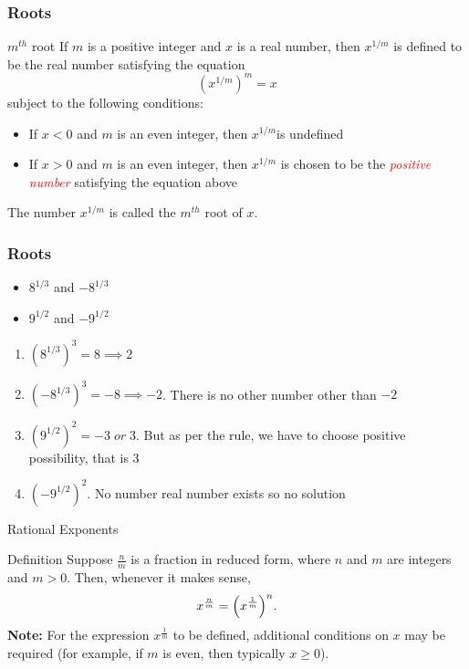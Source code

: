   \begin{frame}
    \frametitle{Roots}
    \begin{block}{\(m^{th}\) root}
   If \(m\) is a positive integer and \(x\) is a real number, then \(x^{1/m}\) is defined to be the real number satisfying the equation
   \[\left(x^{1/m}\right)^{m} = x \]
  subject to the following conditions:
  \begin{itemize}
    \item  If \(x < 0\) and \(m\) is an even integer, then \(x^{1/m} \)is undefined 
    \item If \(x > 0\) and \(m\) is an even integer, then \(x^{1/m} \) is chosen to be the \textit{\textcolor{red}{positive number}} satisfying the equation above
  \end{itemize}
The number \(x^{1/m}\) is called the \textbf{\(m^{th}\)} root of \(x\).
\end{block}
  
\end{frame}
\begin{frame}
  \frametitle{Roots}
  \begin{example}
    \begin{itemize}
      \item \(8^{1/3}\) and \(-8^{1/3}\)
      \item \(9^{1/2}\) and \(-9^{1/2}\)
    \end{itemize}
  \end{example}
  \begin{solution}
    \begin{enumerate}
      \item \( \left(8^{1/3}\right)^{3} = 8 \implies 2 \)
      \item \( \left(-8^{1/3}\right)^{3} = -8 \implies -2 \). There is no other number other than \(-2\)
      \item \( \left( 9^{1/2} \right)^{2} = -3 \; or \;3\). But as per the rule, we have to choose positive possibility, that is \(3\)
      \item \( \left( -9^{1/2} \right)^{2} \). No number real number exists so no solution 
    \end{enumerate}
  \end{solution}
\end{frame}


\begin{frame}{Rational Exponents}
  \begin{block}{Definition}
  Suppose \(\frac{n}{m}\) is a fraction in reduced form, where \(n\) and \(m\) are integers and \(m > 0\). Then, whenever it makes sense,
  \[
    x^{\frac{n}{m}} = \Bigl(x^{\frac{1}{m}}\Bigr)^n.
  \]
  \vspace{0.5em}
  \textbf{Note:} For the expression \(x^{\frac{1}{m}}\) to be defined, additional conditions on \(x\) may be required (for example, if \(m\) is even, then typically \(x \ge 0\)).
  \end{block}
\end{frame}


